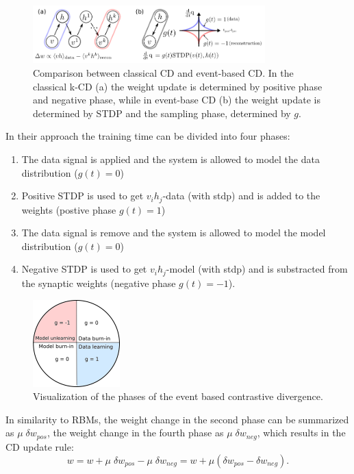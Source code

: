 \begin{figure}
	\centering
    	\includegraphics[width=0.8\textwidth]{imgs/eCD2.png} 
    \caption{Comparison between classical CD and event-based CD. In the classical k-CD (a) the weight update is determined by positive phase and negative phase, while in event-base CD (b) the weight update is determined by STDP and the sampling phase, determined by $g$.}
	\label{fig:test}
\end{figure}
  
In their approach the training time can be divided into four phases:
\begin{enumerate}
\item The data signal is applied and the system is allowed to model the data distribution ($g(t)=0$)
\item Positive STDP is used to get $v_i h_j$-data (with stdp) and is added to the weights (postive phase $g(t)=1$)
\item The data signal is remove and the system is allowed to model the model distribution ($g(t)=0$)
\item Negative STDP is used to get $v_i h_j$-model (with stdp) and is substracted from the synaptic weights (negative phase $g(t)=-1$).
\end{enumerate}


\begin{figure}
	\centering
    	\includegraphics[width=0.3\textwidth]{imgs/eCD11.png} 
    \caption{Visualization of the phases of the event based contrastive divergence.}
	\label{fig:test}
\end{figure}

In similarity to RBMs, the weight change in the second phase can be summarized as $\mu \; \delta w_{pos}$, the weight change in the fourth phase as $\mu \; \delta w_{neg}$, which results in the CD update rule:
\[
w = w +  \mu \; \delta w_{pos} - \mu \; \delta w_{neg} = w +  \mu (\delta w_{pos} - \delta w_{neg}).
\]
 